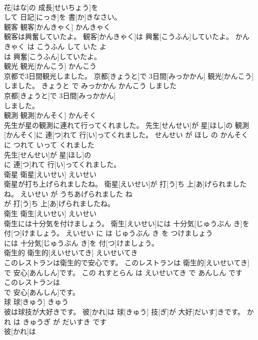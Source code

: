 \documentclass[8pt]{extreport}
\begin{document}
\begin{CJK}{UTF8}{min}
\\	花[はな]の 成長[せいちょう]を
\\	して 日記[にっき]を 書[か]きなさい。			
\\	観客	観客[かんきゃく]	かんきゃく	
\\	観客は興奮していたよ。	観客[かんきゃく]は 興奮[こうふん]していたよ。	かんきゃく は こうふん して いた よ	
\\	は 興奮[こうふん]していたよ。			
\\	観光	観光[かんこう]	かんこう	
\\	京都で3日間観光しました。	京都[きょうと]で 3日間[みっかかん] 観光[かんこう]しました。	きょうと で みっかかん かんこう しました	
\\	京都[きょうと]で 3日間[みっかかん]
\\	しました。			
\\	観測	観測[かんそく]	かんそく	
\\	先生が星の観測に連れて行ってくれました。	先生[せんせい]が 星[ほし]の 観測[かんそく]に 連[つ]れて 行[い]ってくれました。	せんせい が ほし の かんそく に つれて いって くれました	
\\	先生[せんせい]が 星[ほし]の
\\	に 連[つ]れて 行[い]ってくれました。			
\\	衛星	衛星[えいせい]	えいせい	
\\	衛星が打ち上げられましたね。	衛星[えいせい]が 打[う]ち 上[あ]げられましたね。	えいせい が うちあげられました ね	
\\	が 打[う]ち 上[あ]げられましたね。			
\\	衛生	衛生[えいせい]	えいせい	
\\	衛生には十分気を付けましょう。	衛生[えいせい]には 十分気[じゅうぶん き]を 付[つ]けましょう。	えいせい に は じゅうぶん き を つけましょう	
\\	には 十分気[じゅうぶん き]を 付[つ]けましょう。			
\\	衛生的	衛生的[えいせいてき]	えいせいてき	
\\	このレストランは衛生的で安心です。	このレストランは 衛生的[えいせいてき]で 安心[あんしん]です。	この れすとらん は えいせいてき で あんしん です	
\\	このレストランは
\\	で 安心[あんしん]です。			
\\	球	球[きゅう]	きゅう	
\\	彼は球技が大好きです。	彼[かれ]は 球[きゅう] 技[ぎ]が 大好[だいす]きです。	かれ は きゅうぎ が だいすき です	
\\	彼[かれ]は

\end{CJK}
\end{document}
